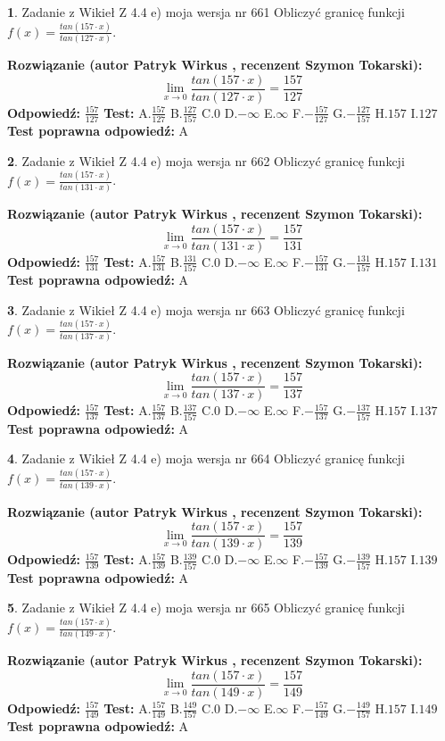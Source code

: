 \documentclass[12pt, a4paper]{article}
\theoremstyle{definition} %
\newtheorem{zad}{}
\newcommand{\zadStart}[1]{\begin{zad}#1\newline}
\newcommand{\zadStop}{\end{zad}}
\newcommand{\rozwStart}[2]{\noindent \textbf{Rozwiązanie (autor #1 , recenzent #2): }\newline}
\newcommand{\rozwStop}{\newline}
\newcommand{\odpStart}{\noindent \textbf{Odpowiedź:}\newline}
\newcommand{\odpStop}{\newline}
\newcommand{\testStart}{\noindent \textbf{Test:}\newline}
\newcommand{\testStop}{\newline}
\newcommand{\kluczStart}{\noindent \textbf{Test poprawna odpowiedź:}\newline}
\newcommand{\kluczStop}{\newline}
\begin{document}
\zadStart{Zadanie z Wikieł Z 4.4 e) moja wersja nr 661}
Obliczyć granicę funkcji $f(x)=\frac{tan(157\cdot x)}{tan(127\cdot x)}$.
\zadStop
\rozwStart{Patryk Wirkus}{Szymon Tokarski}
$$\lim\limits_{x\to 0}\frac{tan(157\cdot x)}{tan(127\cdot x)}=
\frac{157}{127}$$
\rozwStop
\odpStart
$\frac{157}{127}$
\odpStop
\testStart
A.$\frac{157}{127}$
B.$\frac{127}{157}$
C.$0$
D.$-\infty$
E.$\infty$
F.$-\frac{157}{127}$
G.$-\frac{127}{157}$
H.$157$
I.$127$
\testStop
\kluczStart
A
\kluczStop



\zadStart{Zadanie z Wikieł Z 4.4 e) moja wersja nr 662}
Obliczyć granicę funkcji $f(x)=\frac{tan(157\cdot x)}{tan(131\cdot x)}$.
\zadStop
\rozwStart{Patryk Wirkus}{Szymon Tokarski}
$$\lim\limits_{x\to 0}\frac{tan(157\cdot x)}{tan(131\cdot x)}=
\frac{157}{131}$$
\rozwStop
\odpStart
$\frac{157}{131}$
\odpStop
\testStart
A.$\frac{157}{131}$
B.$\frac{131}{157}$
C.$0$
D.$-\infty$
E.$\infty$
F.$-\frac{157}{131}$
G.$-\frac{131}{157}$
H.$157$
I.$131$
\testStop
\kluczStart
A
\kluczStop



\zadStart{Zadanie z Wikieł Z 4.4 e) moja wersja nr 663}
Obliczyć granicę funkcji $f(x)=\frac{tan(157\cdot x)}{tan(137\cdot x)}$.
\zadStop
\rozwStart{Patryk Wirkus}{Szymon Tokarski}
$$\lim\limits_{x\to 0}\frac{tan(157\cdot x)}{tan(137\cdot x)}=
\frac{157}{137}$$
\rozwStop
\odpStart
$\frac{157}{137}$
\odpStop
\testStart
A.$\frac{157}{137}$
B.$\frac{137}{157}$
C.$0$
D.$-\infty$
E.$\infty$
F.$-\frac{157}{137}$
G.$-\frac{137}{157}$
H.$157$
I.$137$
\testStop
\kluczStart
A
\kluczStop



\zadStart{Zadanie z Wikieł Z 4.4 e) moja wersja nr 664}
Obliczyć granicę funkcji $f(x)=\frac{tan(157\cdot x)}{tan(139\cdot x)}$.
\zadStop
\rozwStart{Patryk Wirkus}{Szymon Tokarski}
$$\lim\limits_{x\to 0}\frac{tan(157\cdot x)}{tan(139\cdot x)}=
\frac{157}{139}$$
\rozwStop
\odpStart
$\frac{157}{139}$
\odpStop
\testStart
A.$\frac{157}{139}$
B.$\frac{139}{157}$
C.$0$
D.$-\infty$
E.$\infty$
F.$-\frac{157}{139}$
G.$-\frac{139}{157}$
H.$157$
I.$139$
\testStop
\kluczStart
A
\kluczStop



\zadStart{Zadanie z Wikieł Z 4.4 e) moja wersja nr 665}
Obliczyć granicę funkcji $f(x)=\frac{tan(157\cdot x)}{tan(149\cdot x)}$.
\zadStop
\rozwStart{Patryk Wirkus}{Szymon Tokarski}
$$\lim\limits_{x\to 0}\frac{tan(157\cdot x)}{tan(149\cdot x)}=
\frac{157}{149}$$
\rozwStop
\odpStart
$\frac{157}{149}$
\odpStop
\testStart
A.$\frac{157}{149}$
B.$\frac{149}{157}$
C.$0$
D.$-\infty$
E.$\infty$
F.$-\frac{157}{149}$
G.$-\frac{149}{157}$
H.$157$
I.$149$
\testStop
\kluczStart
A
\kluczStop
\end{document}
